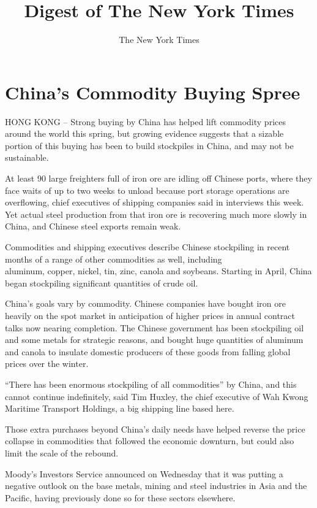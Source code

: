 ﻿\documentclass[12pt,a4paper,onecolumn]{article}
\title{Digest of The New York Times}
\author{The New York Times}
\begin{document}
\date{}
\thispagestyle{empty}
\renewcommand\contentsname{\textsf{Digest of The New York Times}}
\textsf{\tableofcontents}
\pagebreak
\setcounter{page}{1}
\section{China's Commodity Buying Spree}

HONG KONG -- Strong buying by China has helped lift commodity prices around the world this spring,
but growing evidence suggests that a sizable portion of this buying has been to build stockpiles in
China, and may not be sustainable.

At least 90 large freighters full of iron ore are idling off Chinese ports, where they face waits of
up to two weeks to unload because port storage operations are overflowing, chief executives of
shipping companies said in interviews this week. Yet actual steel production from that iron ore is
recovering much more slowly in China, and Chinese steel exports remain weak.

Commodities and shipping executives describe Chinese stockpiling in recent months of a range of
other commodities as well, including \\ aluminum, copper, nickel, tin, zinc, canola and soybeans.
Starting in April, China began stockpiling significant quantities of crude oil.

China's goals vary by commodity. Chinese companies have bought iron ore heavily on the spot market
in anticipation of higher prices in annual contract talks now nearing completion. The Chinese
government has been stockpiling oil and some metals for strategic reasons, and bought huge
quantities of aluminum and canola to insulate domestic producers of these goods from falling global
prices over the winter.

``There has been enormous stockpiling of all commodities'' by China, and this cannot continue
indefinitely, said Tim Huxley, the chief executive of Wah Kwong Maritime Transport Holdings, a big
shipping line based here.

Those extra purchases beyond China's daily needs have helped reverse the price collapse in
commodities that followed the economic downturn, but could also limit the scale of the rebound.

Moody's Investors Service announced on Wednesday that it was putting a negative outlook on the base
metals, mining and steel industries in Asia and the Pacific, having previously done so for these
sectors elsewhere.
\end{document}
